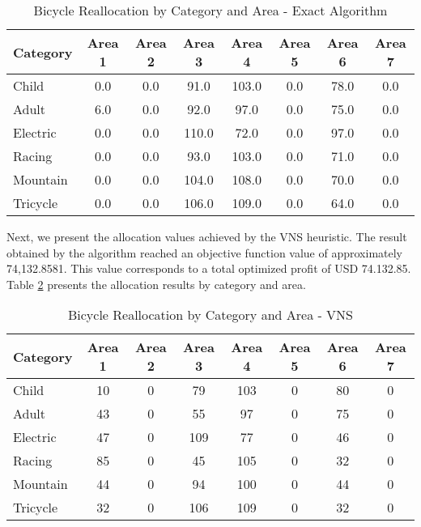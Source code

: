 \documentclass[]{article}
\begin{document}
\begin{table}[H]
	\centering
	\begin{tabular}{lccccccc}
		\hline
		\textbf{Category} & \textbf{Area 1} & \textbf{Area 2} & \textbf{Area 3} & \textbf{Area 4} & \textbf{Area 5} & \textbf{Area 6} & \textbf{Area 7} \\
		\hline
		Child    & 0.0  & 0.0  & 91.0  & 103.0 & 0.0  & 78.0  & 0.0  \\
		Adult    & 6.0  & 0.0  & 92.0  & 97.0  & 0.0  & 75.0  & 0.0  \\
		Electric & 0.0  & 0.0  & 110.0 & 72.0  & 0.0  & 97.0  & 0.0  \\
		Racing   & 0.0  & 0.0  & 93.0  & 103.0 & 0.0  & 71.0  & 0.0  \\
		Mountain & 0.0  & 0.0  & 104.0 & 108.0 & 0.0  & 70.0  & 0.0  \\
		Tricycle & 0.0  & 0.0  & 106.0 & 109.0 & 0.0  & 64.0  & 0.0  \\
		\hline
	\end{tabular}
	\caption{Bicycle Reallocation by Category and Area - Exact Algorithm}
	\label{tab:resultados-exact}
\end{table}

Next, we present the allocation values achieved by the VNS heuristic. The result obtained by the algorithm reached an objective function value of approximately 74,132.8581. This value corresponds to a total optimized profit of USD 74.132.85. Table \ref{tab:resultados-vns} presents the allocation results by category and area.


\begin{table}[H]
	\centering
	
	\begin{tabular}{l|ccccccc}
		\hline
		\textbf{Category} & \textbf{Area 1} & \textbf{Area 2} & \textbf{Area 3} & \textbf{Area 4} & \textbf{Area 5} & \textbf{Area 6} & \textbf{Area 7} \\
		\hline
		Child      & 10    & 0     & 79    & 103   & 0     & 80    & 0     \\
		Adult      & 43    & 0     & 55    & 97    & 0     & 75    & 0     \\
		Electric   & 47    & 0     & 109   & 77    & 0     & 46    & 0     \\
		Racing     & 85    & 0     & 45    & 105   & 0     & 32    & 0     \\
		Mountain   & 44    & 0     & 94    & 100   & 0     & 44    & 0     \\
		Tricycle   & 32    & 0     & 106   & 109   & 0     & 32    & 0     \\
		\hline
		
	\end{tabular}
	\caption{Bicycle Reallocation by Category and Area - VNS}
	\label{tab:resultados-vns}
\end{table}
\end{document}
